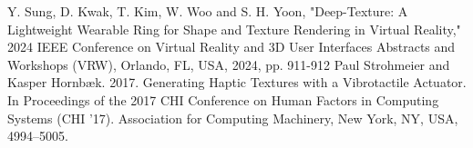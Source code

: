 \documentclass[a4paper,twocolumn]{article}
\begin{document}
\begin{thebibliography}{99}
  \scriptsize
     Y. Sung, D. Kwak, T. Kim, W. Woo and S. H. Yoon, "Deep-Texture: A Lightweight Wearable Ring for Shape and Texture Rendering in Virtual Reality," 2024 IEEE Conference on Virtual Reality and 3D User Interfaces Abstracts and Workshops (VRW), Orlando, FL, USA, 2024, pp. 911-912
     Paul Strohmeier and Kasper Hornbæk. 2017. Generating Haptic Textures with a Vibrotactile Actuator. In Proceedings of the 2017 CHI Conference on Human Factors in Computing Systems (CHI '17). Association for Computing Machinery, New York, NY, USA, 4994–5005.
\end{thebibliography}
\end{document}
